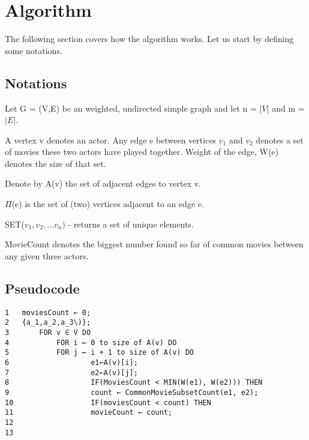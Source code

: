 \label{Algorithm}
\section{Algorithm}

The following section covers how the algorithm works.
Let us start by defining some notations.

\subsection{Notations}
Let G = (V,E) be an weighted, undirected simple graph and let n = \(\lvert V\rvert\) and m = \(\lvert E\rvert\).

A vertex v denotes an actor. Any edge e between vertices \(v_1\) and \(v_2\) denotes a set of movies these two actors have played together. Weight of the edge, W(e) denotes the size of that set.

Denote by A(v) the set of adjacent edges to vertex v.

\(\Pi\)(e) is the set of (two) vertices adjacent to an edge e.

SET(\(v_1, v_2,... v_n)\) - returns a set of unique elements.

MovieCount denotes the biggest number found so far of common movies between any given three actors.
\subsection{Pseudocode}



\begin{verbatim}
1	moviesCount ← 0;
2	{a_1,a_2,a_3\)};
3	    FOR v ∈ V DO
4	        FOR i ← 0 to size of A(v) DO
5		    FOR j ← i + 1 to size of A(v) DO
6	                e1←A(v)[i];
7	                e2←A(v)[j];
8	                IF(MoviesCount < MIN(W(e1), W(e2))) THEN
9	                count ← CommonMovieSubsetCount(e1, e2);
10	                IF(moviesCount < count) THEN
11	                movieCount ← count;
12	              
13	                
	            
	            
\end{verbatim}

